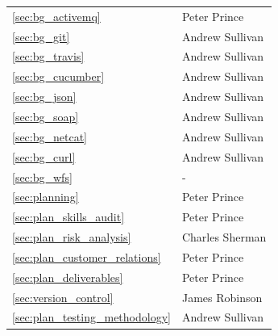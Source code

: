 \documentclass[a4paper, 12pt, twoside]{article}
\newcommand*{\fullref}[1]{\ref{#1} \nameref{#1}}
\begin{document}
\begin{tabularx}{\textwidth}{|X|X|}
  \fullref{sec:bg_activemq}              & Peter Prince                       \\
  \fullref{sec:bg_git}                   & Andrew Sullivan                    \\
  \fullref{sec:bg_travis}                & Andrew Sullivan                    \\
  \fullref{sec:bg_cucumber}              & Andrew Sullivan                    \\
  \fullref{sec:bg_json}                  & Andrew Sullivan                    \\
  \fullref{sec:bg_soap}                  & Andrew Sullivan                    \\
  \fullref{sec:bg_netcat}                & Andrew Sullivan                    \\
  \fullref{sec:bg_curl}                  & Andrew Sullivan                    \\
  \fullref{sec:bg_wfs}                   & -                                  \\ \hline
  \fullref{sec:planning}                 & Peter Prince                       \\
  \fullref{sec:plan_skills_audit}        & Peter Prince                       \\
  \fullref{sec:plan_risk_analysis}       & Charles Sherman                    \\
  \fullref{sec:plan_customer_relations}  & Peter Prince                       \\
  \fullref{sec:plan_deliverables}        & Peter Prince                       \\
  \fullref{sec:version_control}          & James Robinson                     \\
  \fullref{sec:plan_testing_methodology} & Andrew Sullivan                    \\ \hline
\end{tabularx}
\newpage
\end{document}
